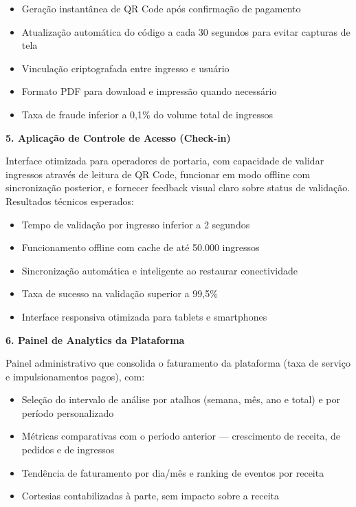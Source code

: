 \begin{itemize}
    \item Geração instantânea de QR Code após confirmação de pagamento
    \item Atualização automática do código a cada 30 segundos para evitar capturas de tela
    \item Vinculação criptografada entre ingresso e usuário
    \item Formato PDF para download e impressão quando necessário
    \item Taxa de fraude inferior a 0,1\% do volume total de ingressos
\end{itemize}

\textbf{5. Aplicação de Controle de Acesso (Check-in)}

Interface otimizada para operadores de portaria, com capacidade de validar ingressos através de leitura de QR Code, funcionar em modo offline com sincronização posterior, e fornecer feedback visual claro sobre status de validação. Resultados técnicos esperados:

\begin{itemize}
    \item Tempo de validação por ingresso inferior a 2 segundos
    \item Funcionamento offline com cache de até 50.000 ingressos
    \item Sincronização automática e inteligente ao restaurar conectividade
    \item Taxa de sucesso na validação superior a 99,5\%
    \item Interface responsiva otimizada para tablets e smartphones
\end{itemize}

\textbf{6. Painel de Analytics da Plataforma}

Painel administrativo que consolida o faturamento da plataforma (taxa de serviço e impulsionamentos pagos), com:

\begin{itemize}
    \item Seleção do intervalo de análise por atalhos (semana, mês, ano e total) e por período personalizado
    \item Métricas comparativas com o período anterior — crescimento de receita, de pedidos e de ingressos
    \item Tendência de faturamento por dia/mês e ranking de eventos por receita
    \item Cortesias contabilizadas à parte, sem impacto sobre a receita
\end{itemize}

